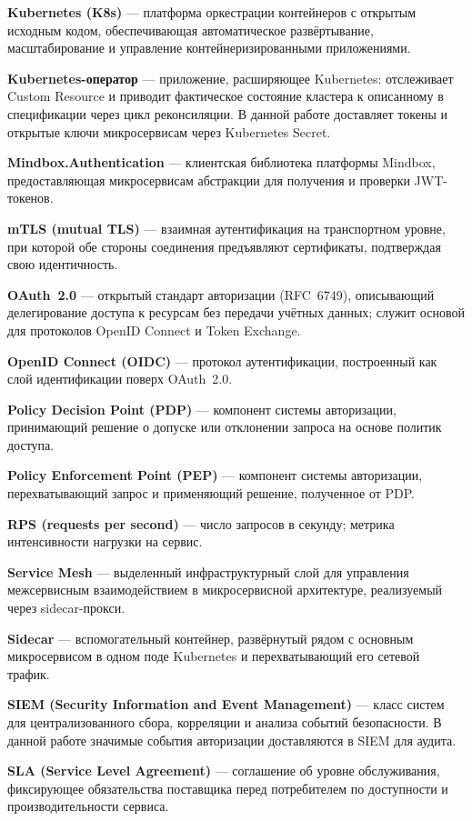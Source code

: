 \textbf{Kubernetes (K8s)} --- платформа оркестрации контейнеров с открытым исходным кодом,
обеспечивающая автоматическое развёртывание, масштабирование
и управление контейнеризированными приложениями.

\textbf{Kubernetes-оператор} --- приложение, расширяющее Kubernetes:
отслеживает Custom Resource и приводит фактическое состояние кластера
к описанному в спецификации через цикл реконсиляции.
В данной работе доставляет токены и открытые ключи микросервисам
через Kubernetes Secret.

\textbf{Mindbox.Authentication} --- клиентская библиотека платформы Mindbox,
предоставляющая микросервисам абстракции для получения и проверки JWT-токенов.

\textbf{mTLS (mutual TLS)} --- взаимная аутентификация на транспортном уровне,
при которой обе стороны соединения предъявляют сертификаты,
подтверждая свою идентичность.

\textbf{OAuth~2.0} --- открытый стандарт авторизации (RFC~6749),
описывающий делегирование доступа к ресурсам без передачи учётных данных;
служит основой для протоколов OpenID Connect и Token Exchange.

\textbf{OpenID Connect (OIDC)} --- протокол аутентификации,
построенный как слой идентификации поверх OAuth~2.0.

\textbf{Policy Decision Point (PDP)} --- компонент системы авторизации,
принимающий решение о допуске или отклонении запроса
на основе политик доступа.

\textbf{Policy Enforcement Point (PEP)} --- компонент системы авторизации,
перехватывающий запрос и применяющий решение, полученное от PDP.

\textbf{RPS (requests per second)} --- число запросов в секунду;
метрика интенсивности нагрузки на сервис.

\textbf{Service Mesh} --- выделенный инфраструктурный слой
для управления межсервисным взаимодействием в микросервисной архитектуре,
реализуемый через sidecar-прокси.

\textbf{Sidecar} --- вспомогательный контейнер,
развёрнутый рядом с основным микросервисом в одном поде Kubernetes
и перехватывающий его сетевой трафик.

\textbf{SIEM (Security Information and Event Management)} --- класс систем
для централизованного сбора, корреляции и анализа событий безопасности.
В данной работе значимые события авторизации доставляются в SIEM для аудита.

\textbf{SLA (Service Level Agreement)} --- соглашение об уровне обслуживания,
фиксирующее обязательства поставщика перед потребителем
по доступности и производительности сервиса.

